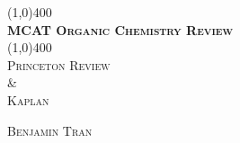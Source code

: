 \documentclass[10pt,a4paper]{report}
\makeatletter
\let\org@subfile
\renewcommand*{}[1]{%
  \filename@parse{#1}%
  \expandafter
  \graphicspath\expandafter{\expandafter{\filename@area/images/}}%
  \org@subfile{#1}%
}
\makeatother
\begin{document}
\begin{titlepage}
	\begin{center}
		\line(1,0){400}\\
		[0.25in]
		\huge{\bfseries \textsc{MCAT Organic Chemistry Review}}\\
		[0.10in]
		\line(1,0){400}\\
		\textsc{Princeton Review}\\
		\& \\
		\textsc{Kaplan\supdag}\\
		[10cm]
	\end{center}
	
	\begin{flushright}
		\textsc{Benjamin Tran}
	\end{flushright}
\end{titlepage}
	
	
	\tableofcontents
	\thispagestyle{empty}
	\cleardoublepage
	
	\setcounter{page}{1}

	
	
	
	
%	
	
\end{document}
